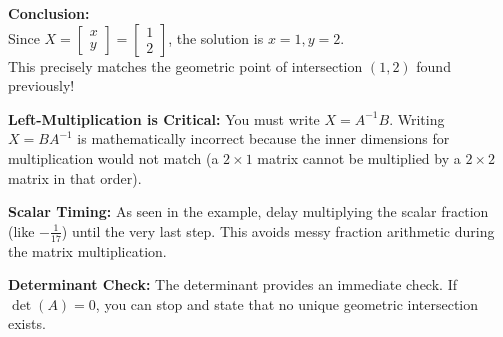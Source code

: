 \begin{solution}
\medskip
\textbf{Conclusion:} \\
Since $X = \begin{bmatrix} x \\ y \end{bmatrix} = \begin{bmatrix} 1 \\ 2 \end{bmatrix}$, the solution is $x = 1, y = 2$. \\
This precisely matches the geometric point of intersection $(1, 2)$ found previously!
\end{solution}

\begin{takeaways}
\item \textbf{Left-Multiplication is Critical:} You must write $X = A^{-1}B$. Writing $X = BA^{-1}$ is mathematically incorrect because the inner dimensions for multiplication would not match (a $2 \times 1$ matrix cannot be multiplied by a $2 \times 2$ matrix in that order).
\item \textbf{Scalar Timing:} As seen in the example, delay multiplying the scalar fraction (like $-\frac{1}{17}$) until the very last step. This avoids messy fraction arithmetic during the matrix multiplication.
\item \textbf{Determinant Check:} The determinant provides an immediate check. If $\det(A) = 0$, you can stop and state that no unique geometric intersection exists.
\end{takeaways}
